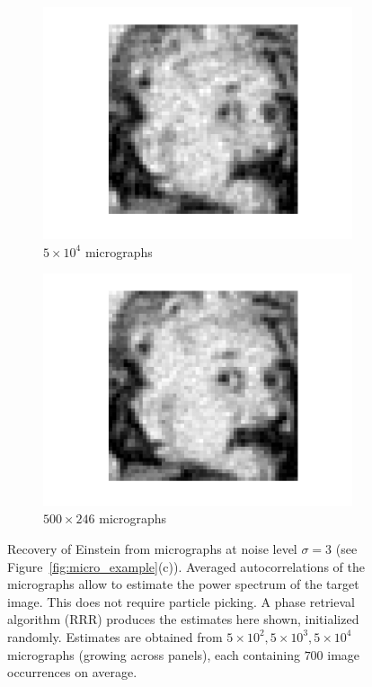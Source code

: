 \documentclass[9pt,twocolumn,twoside,lineno]{pnas-new}
\begin{document}
\begin{figure}[h]
\begin{subfigure}[h]{0.24\textwidth}
		\includegraphics[scale=0.35]{Einstien_progress_100}
		\caption{$5\times 10^4$ micrographs}
	\end{subfigure} 
	\begin{subfigure}[h]{0.24\textwidth}
		\centering
		\includegraphics[scale=0.35]{Einstien_progress_246}
		\caption{$500\times 246$ micrographs}
	\end{subfigure}
	\caption{\label{fig:Einst_example} Recovery of Einstein from micrographs at noise level $\sigma = 3$ (see Figure~\ref{fig:micro_example}(c)). Averaged autocorrelations of the micrographs allow to estimate the power spectrum of the target image. This does not require particle picking. A phase retrieval algorithm (RRR) produces the estimates here shown, initialized randomly. Estimates are obtained from $5\times 10^2,5\times 10^3,5\times 10^4$ micrographs (growing across panels), each containing $700$ image occurrences on average. }	
\end{figure}
\end{document}
